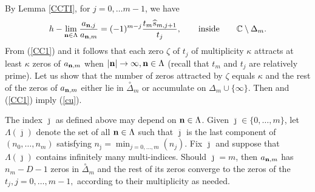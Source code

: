 \documentclass[10pt,a4paper]{article}
\theoremstyle{definition}
\theoremstyle{remark}
\numberwithin{equation}{section}
\begin{document}
By Lemma \ref{CCTI}, for $j=0,\ldots m-1$,  we have
\begin{equation}\label{CC1}
h-\lim_{{\bf n}\in \Lambda}\frac{a_{{\bf n}, j} }{a_{{\bf n},m} } = (-1)^{m-j}\frac{t_m\widehat{s}_{m,j+1}}{t_j}, \qquad \mbox{inside} \qquad \mathbb{C} \setminus \Delta_m.
\end{equation}
From (\ref{CC1}) and \cite[Lemma 1]{Gon} it follows that each zero $\zeta$ of $t_j $ of multiplicity $\kappa$ attracts at least $\kappa$ zeros of $a_{{\bf n},m}$ when $|{\bf n}| \to \infty, {\bf n} \in \Lambda$ (recall that $t_m$ and $t_j$ are relatively prime). Let us show that the number of zeros attracted by $\zeta$ equals $\kappa$ and the rest of the zeros of $a_{{\bf n},m}$ either lie in $\stackrel{\circ}{\Delta}_m$ or accumulate on $\Delta_m \cup \{\infty\}$. Then \cite[Lemma 1]{Gon} and (\ref{CC1}) imply (\ref{cu}).


The index $\overline{\jmath}$ as defined above may depend on  ${\bf n} \in \Lambda$. Given $\overline{\jmath} \in \{0,\ldots,m\}$, let $\Lambda(\overline{\jmath})$ denote the set of all ${\bf n} \in \Lambda$ such that $\overline{\jmath}$ is the last component of $(n_0,\ldots,n_m)$ satisfying $n_{\overline{\jmath}} = \min_{j=0,\ldots,m} (n_j)$. Fix $\overline{\jmath}$ and suppose that $\Lambda(\overline{\jmath})$ contains infinitely many multi-indices.
Should $\overline{\jmath} = m$, then $a_{{\bf n},m}$ has $n_m -D -1$ zeros in $\stackrel{\circ}{\Delta}_m$ and the rest of its zeros converge to the zeros of the $t_j, j=0,\ldots,m-1,$ according to their multiplicity as needed.
\end{document}
